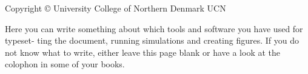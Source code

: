 \thispagestyle{empty}
{\small
\strut\vfill %
\noindent Copyright \copyright{} University College of Northern Denmark UCN \the\year\par
\vspace{0.2cm}
\noindent
Here you can write something about which tools and software you have used for typeset- ting the document, running simulations and creating figures. If you do not know what to write, either leave this page blank or have a look at the colophon in some of your books.
}
\clearpage

